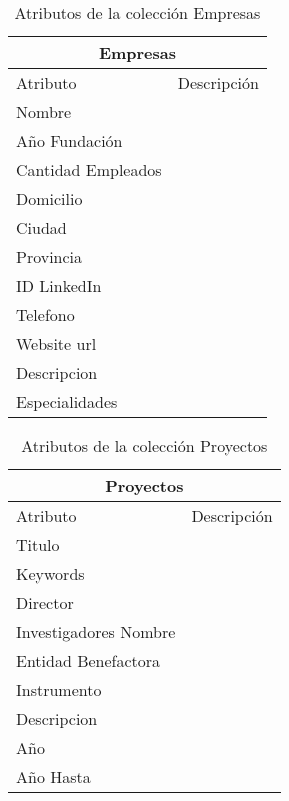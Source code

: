 \begin{center}
\begin{table}
\begin{tabular}{| l | l |}
\hline
\multicolumn{2}{|c|}{Empresas} \\ \hline
Atributo & Descripción \\ \hline
Nombre & \\ \hline 
Año Fundación & \\ \hline 
Cantidad Empleados & \\ \hline 
Domicilio & \\ \hline 
Ciudad & \\ \hline 
Provincia & \\ \hline 
ID LinkedIn & \\ \hline 
Telefono & \\ \hline 
Website url & \\ \hline 
Descripcion & \\ \hline 
Especialidades & \\ \hline 
\end{tabular}
\caption{Atributos de la colección Empresas}
\label{table:empresas}
\end{table}
\end{center}

\begin{center}
\begin{table}
\begin{tabular}{| l | l |}
\hline
\multicolumn{2}{|c|}{Proyectos} \\ \hline
Atributo & Descripción \\ \hline
Titulo & \\ \hline 
Keywords & \\ \hline 
Director & \\ \hline 
Investigadores Nombre & \\ \hline 
Entidad Benefactora & \\ \hline 
Instrumento & \\ \hline 
Descripcion & \\ \hline 
Año & \\ \hline 
Año Hasta & \\ \hline
\end{tabular}
\caption{Atributos de la colección Proyectos}
\label{table:proyectos}
\end{table}
\end{center}

